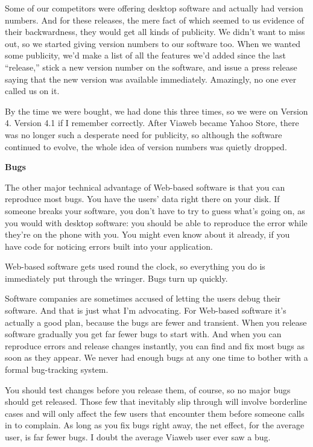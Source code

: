 Some of our competitors were offering desktop software and actually had
version numbers. And for these releases, the mere fact of which seemed
to us evidence of their backwardness, they would get all kinds of
publicity. We didn't want to miss out, so we started giving version
numbers to our software too. When we wanted some publicity, we'd make a
list of all the features we'd added since the last ``release,'' stick a
new version number on the software, and issue a press release saying
that the new version was available immediately. Amazingly, no one ever
called us on it.

By the time we were bought, we had done this three times, so we were on
Version 4. Version 4.1 if I remember correctly. After Viaweb became
Yahoo Store, there was no longer such a desperate need for publicity, so
although the software continued to evolve, the whole idea of version
numbers was quietly dropped.

\textbf{Bugs}

The other major technical advantage of Web-based software is that you
can reproduce most bugs. You have the users' data right there on your
disk. If someone breaks your software, you don't have to try to guess
what's going on, as you would with desktop software: you should be able
to reproduce the error while they're on the phone with you. You might
even know about it already, if you have code for noticing errors built
into your application.

Web-based software gets used round the clock, so everything you do is
immediately put through the wringer. Bugs turn up quickly.

Software companies are sometimes accused of letting the users debug
their software. And that is just what I'm advocating. For Web-based
software it's actually a good plan, because the bugs are fewer and
transient. When you release software gradually you get far fewer bugs to
start with. And when you can reproduce errors and release changes
instantly, you can find and fix most bugs as soon as they appear. We
never had enough bugs at any one time to bother with a formal
bug-tracking system.

You should test changes before you release them, of course, so no major
bugs should get released. Those few that inevitably slip through will
involve borderline cases and will only affect the few users that
encounter them before someone calls in to complain. As long as you fix
bugs right away, the net effect, for the average user, is far fewer
bugs. I doubt the average Viaweb user ever saw a bug.

